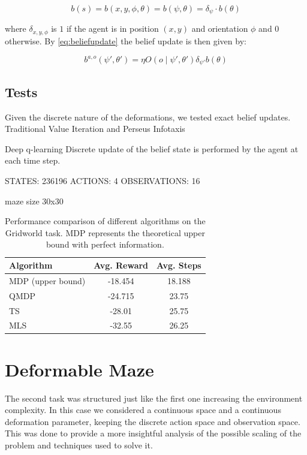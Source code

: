 $$b(s) = b(x,y,\phi,\theta) = b(\psi, \theta) = \delta_{\psi} \cdot b(\theta)$$

where $\delta_{x,y,\phi}$ is $1$ if the agent is in position $(x,y)$ and orientation $\phi$ and $0$ otherwise.
By \cref{eq:beliefupdate} the belief update is then given by:

\begin{equation}
    \label{eq:beliefupdategridworld}
    b^{a,o}(\psi',\theta') = \eta O(o\mid \psi',\theta') \delta_{\psi'}b(\theta) 
\end{equation}



\subsection{Tests}

Given the discrete nature of the deformations, we tested exact belief updates.
Traditional Value Iteration and Perseus Infotaxis

Deep q-learning 
Discrete update of the belief state is performed by the agent at each time step.


STATES: 236196
ACTIONS: 4
OBSERVATIONS: 16

maze size 30x30

\begin{table}[h]
\centering
\begin{tabular}{lcc}
\toprule
\textbf{Algorithm} & \textbf{Avg. Reward} & \textbf{Avg. Steps} \\
\midrule
MDP (upper bound) & -18.454 & 18.188 \\
QMDP & -24.715 & 23.75 \\
TS & -28.01 & 25.75 \\
MLS & -32.55 & 26.25 \\
\bottomrule
\end{tabular}
\caption{Performance comparison of different algorithms on the Gridworld task. MDP represents the theoretical upper bound with perfect information.}
\label{tab:gridworld_results}
\end{table}



\section{Deformable Maze}
The second task was structured just like the first one increasing the environment complexity.
In this case we considered a continuous space and a continuous deformation parameter, 
keeping the discrete action space and observation space. This was done to provide 
a more insightful analysis of the possible scaling of the problem and techniques 
used to solve it.
   
